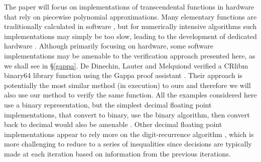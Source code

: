 \documentclass{fac}
\begin{document}
The paper will focus on implementations of transcendental functions in hardware that rely on piecewise polynomial approximations. Many elementary functions are traditionally calculated in software \cite{10.5555/1096483,gal1991accurate}, but for numerically intensive algorithms such implementations may simply be too slow, leading to the development of dedicated hardware \cite{tang1991table,strollo2011elementary,pineiro2004algorithm}. Although primarily focusing on hardware, some software implementations may be amenable to the verification approach presented here, as we shall see in \S\ref{gappa}. De Dinechin, Lauter and Melquiond verified a CRlibm binary64 library function using the Gappa proof assistant \cite{daramy2009cr,5483294}. Their approach is potentially the most similar method (in execution) to ours and therefore we will also use our method to verify the same function. All the examples considered here use a binary representation, but the simplest decimal floating point implementations, that convert to binary, use the binary algorithm, then convert back to decimal would also be amenable \cite{5223332}. Other decimal floating point implementations appear to rely more on the digit-recurrence algorithm \cite{5223326,5710893}, which is more challenging to reduce to a series of inequalities since decisions are typically made at each iteration based on information from the previous iterations.

\end{document}
